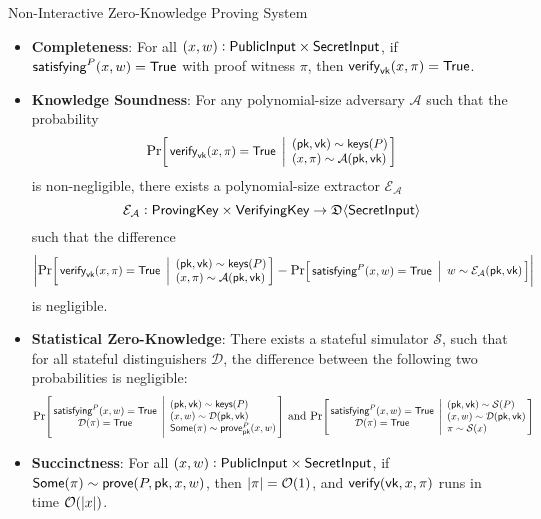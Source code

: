 \begin{definitiontoc}{Non-Interactive Zero-Knowledge Proving System}
    \begin{itemize}
        \item \textbf{Completeness}: For all $(x, w) : {\textsf{PublicInput}} \times {\textsf{SecretInput}}$, if ${\textsf{satisfying}}^P(x, w) = {\textsf{True}}$ with proof witness $\pi$, then ${\textsf{verify}}_{\textsf{vk}}(x, \pi) = {\textsf{True}}$.
        \item \textbf{Knowledge Soundness}: For any polynomial-size adversary $\mathcal{A}$ such that the probability 
        \[
            \Prob{
                \verify_\vk(x, \pi) = \True
            }{
                (\pk, \vk) \sim \keys(P) \\
                (x, \pi) \sim \mathcal{A}(\pk, \vk)
            }
        \]
            is non-negligible, there exists a polynomial-size extractor $\mathcal{E}_\mathcal{A}$
            \[\mathcal{E}_\mathcal{A} : {\textsf{ProvingKey}} \times {\textsf{VerifyingKey}} \to \mathfrak{D}\langle{{\textsf{SecretInput}}}\rangle\]
            such that the difference
            \[ \left|
                \Prob{
                \verify_\vk(x, \pi) = \True
            }{
                (\pk, \vk) \sim \keys(P) \\
                (x, \pi) \sim \mathcal{A}(\pk, \vk)
            } - \Prob{
                    \satisfying^P(x, w) = \True
                }{
                    w \sim \mathcal{E}_\mathcal{A}(\pk, \vk)
                } \right| 
            \]
            is negligible.
        \item \textbf{Statistical Zero-Knowledge}: There exists a stateful simulator $\mathcal{S}$, such that for all stateful distinguishers $\mathcal{D}$, the difference between the following two probabilities is negligible:
            \[
                \Prob{
                    \satisfying^P(x, w) = \True \\
                    \mathcal{D}(\pi) = \True
                }{
                    (\pk, \vk) \sim \keys(P) \\
                    (x, w) \sim \mathcal{D}(\pk, \vk) \\
                    \Some(\pi) \sim \prove^P_\pk(x, w)
                }
                \,\,\text{and}\,\,
                \Prob{
                    \satisfying^P(x, w) = \True \\
                    \mathcal{D}(\pi) = \True
                }{
                    (\pk, \vk) \sim \mathcal{S}(P) \\
                    (x, w) \sim \mathcal{D}(\pk, \vk) \\
                    \pi \sim \mathcal{S}(x)
                }
            \]
        \item \textbf{Succinctness}: For all $(x, w) : {\textsf{PublicInput}} \times {\textsf{SecretInput}}$, if ${\textsf{Some}}(\pi) \sim {\textsf{prove}}(P, {\textsf{pk}}, x, w)$, then $\left|\pi\right| = \mathcal{O}(1)$, and ${\textsf{verify}}({\textsf{vk}}, x, \pi)$ runs in time $\mathcal{O}(\left|x\right|)$.
    \end{itemize}
\end{definitiontoc}

